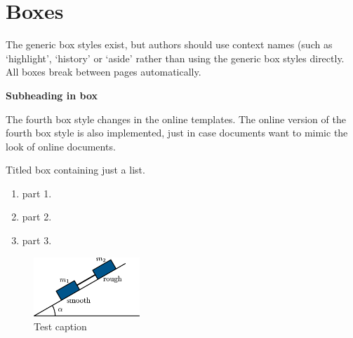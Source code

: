 \documentclass[solutionsatend,twocolumnsolutions]{ouunit}
\begin{document}
\section{Boxes}
The generic box styles exist, but authors should use context names (such as `highlight', `history' or `aside' rather than using the generic box styles directly. All boxes break between pages automatically.
\begin{style1box}
\textbf{Subheading in box}

\lipsum[1]
\end{style1box}
\lipsum[133]
\begin{style2box}
\lipsum[2]
\end{style2box}
\lipsum[133]
\begin{style3box}
\lipsum[3]
\end{style3box}
\lipsum[133]
\begin{style4box}
\lipsum[4]
\end{style4box}
The fourth box style changes in the online templates. The online version of the fourth box style is also implemented, just in case documents want to mimic the look of online documents.
\begin{onlinestyle4box}
\lipsum[4]
\end{onlinestyle4box}
Titled box containing just a list.
\begin{style4box}[Solution]
\begin{enumerate}
\item part 1.
\item part 2.
\item part 3.
\end{enumerate}
\end{style4box}
\lipsum[133]
\begin{style2box}
\begin{figure}
\caption{Test caption}
\includegraphics[width=4cm]{test}
\end{figure}
\end{style2box}
\end{document}
